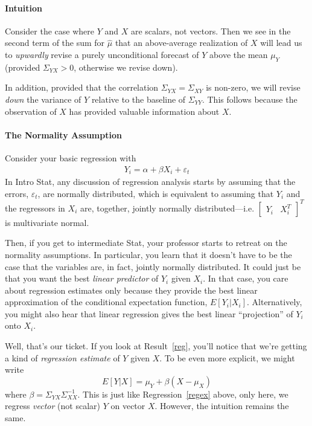 \documentclass[a4paper,12pt]{article}
\begin{document}
\paragraph{Intuition}
Consider the case where $Y$ and $X$ are scalars, not vectors. Then we
see in the second term of the sum for $\hat{\mu}$ that an above-average
realization of $X$ will lead us to \emph{upwardly} revise a purely
unconditional forecast of $Y$ above the mean $\mu_Y$ (provided
$\Sigma_{YX}>0$, otherwise we revise down).

In addition, provided that the correlation $\Sigma_{YX} = \Sigma_{XY}$
is non-zero, we will revise \emph{down} the variance of $Y$ relative to
the baseline of $\Sigma_{YY}$. This follows because the observation of
$X$ has provided valuable information about $X$.


\paragraph{The Normality Assumption}
Consider your basic regression with
\begin{align}
  \label{regex}
  Y_i = \alpha + \beta X_i + \varepsilon_t
\end{align}
In Intro Stat, any discussion of regression analysis starts by assuming
that the errors, $\varepsilon_t$, are normally distributed, which is
equivalent to assuming that $Y_i$ and the regressors in $X_i$ are,
together, jointly normally distributed---i.e.  $\begin{bmatrix} Y_i &
  X^T_i \end{bmatrix}^T$ is  multivariate normal.

Then, if you get to intermediate Stat, your professor starts to retreat
on the normality assumptions. In particular, you learn that it doesn't
have to be the case that the variables are, in fact, jointly normally
distributed. It could just be that you want the best \emph{linear
predictor} of $Y_i$ given $X_i$. In that case, you care about regression
estimates only because they provide the best linear approximation of the
conditional expectation function, $E[Y_i|X_i]$. Alternatively, you might
also hear that linear regression gives the best linear ``projection'' of
$Y_i$ onto $X_i$.

Well, that's our ticket. If you look at Result~\ref{reg}, you'll notice
that we're getting a kind of \emph{regression estimate} of $Y$ given
$X$. To be even more explicit, we might write
\[
  E[Y|X] = \mu_Y + \beta (X - \mu_X)
\]
where $\beta= \Sigma_{YX}\Sigma^{-1}_{XX}$. This is just like
Regression~\ref{regex} above, only here, we regress \emph{vector} (not
scalar) $Y$ on vector $X$. However, the intuition remains the same.
\end{document}
